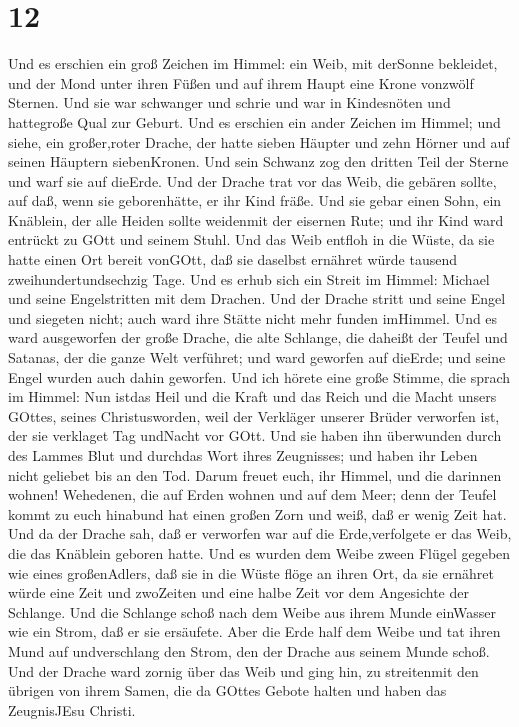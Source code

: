 \hypertarget{section-10}{%
\section{12}\label{section-10}}

 Und es erschien ein groß Zeichen im Himmel: ein Weib, mit
derSonne bekleidet, und der Mond unter ihren Füßen und auf ihrem Haupt
eine Krone vonzwölf Sternen.  Und sie war schwanger und
schrie und war in Kindesnöten und hattegroße Qual zur Geburt.
 Und es erschien ein ander Zeichen im Himmel; und siehe, ein
großer,roter Drache, der hatte sieben Häupter und zehn Hörner und auf
seinen Häuptern siebenKronen.  Und sein Schwanz zog den
dritten Teil der Sterne und warf sie auf dieErde. Und der Drache trat
vor das Weib, die gebären sollte, auf daß, wenn sie geborenhätte, er ihr
Kind fräße.  Und sie gebar einen Sohn, ein Knäblein, der
alle Heiden sollte weidenmit der eisernen Rute; und ihr Kind ward
entrückt zu GOtt und seinem Stuhl.  Und das Weib entfloh in
die Wüste, da sie hatte einen Ort bereit vonGOtt, daß sie daselbst
ernähret würde tausend zweihundertundsechzig Tage.  Und es
erhub sich ein Streit im Himmel: Michael und seine Engelstritten mit dem
Drachen. Und der Drache stritt und seine Engel  und siegeten
nicht; auch ward ihre Stätte nicht mehr funden imHimmel. 
Und es ward ausgeworfen der große Drache, die alte Schlange, die daheißt
der Teufel und Satanas, der die ganze Welt verführet; und ward geworfen
auf dieErde; und seine Engel wurden auch dahin geworfen. 
Und ich hörete eine große Stimme, die sprach im Himmel: Nun istdas Heil
und die Kraft und das Reich und die Macht unsers GOttes, seines
Christusworden, weil der Verkläger unserer Brüder verworfen ist, der sie
verklaget Tag undNacht vor GOtt.  Und sie haben ihn
überwunden durch des Lammes Blut und durchdas Wort ihres Zeugnisses; und
haben ihr Leben nicht geliebet bis an den Tod.  Darum
freuet euch, ihr Himmel, und die darinnen wohnen! Wehedenen, die auf
Erden wohnen und auf dem Meer; denn der Teufel kommt zu euch hinabund
hat einen großen Zorn und weiß, daß er wenig Zeit hat.  Und
da der Drache sah, daß er verworfen war auf die Erde,verfolgete er das
Weib, die das Knäblein geboren hatte.  Und es wurden dem
Weibe zween Flügel gegeben wie eines großenAdlers, daß sie in die Wüste
flöge an ihren Ort, da sie ernähret würde eine Zeit und zwoZeiten und
eine halbe Zeit vor dem Angesichte der Schlange.  Und die
Schlange schoß nach dem Weibe aus ihrem Munde einWasser wie ein Strom,
daß er sie ersäufete.  Aber die Erde half dem Weibe und tat
ihren Mund auf undverschlang den Strom, den der Drache aus seinem Munde
schoß.  Und der Drache ward zornig über das Weib und ging
hin, zu streitenmit den übrigen von ihrem Samen, die da GOttes Gebote
halten und haben das ZeugnisJEsu Christi.

